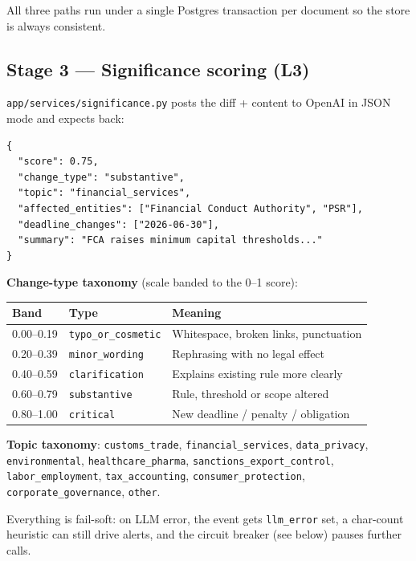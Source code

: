 \documentclass[11pt,a4paper]{article}
\begin{document}
All three paths run under a single Postgres transaction per document
so the store is always consistent.

\subsection{Stage 3 --- Significance scoring (L3)}

\texttt{app/services/significance.py} posts the diff + content to
OpenAI in JSON mode and expects back:

\begin{lstlisting}[style=output]
{
  "score": 0.75,
  "change_type": "substantive",
  "topic": "financial_services",
  "affected_entities": ["Financial Conduct Authority", "PSR"],
  "deadline_changes": ["2026-06-30"],
  "summary": "FCA raises minimum capital thresholds..."
}
\end{lstlisting}

\textbf{Change-type taxonomy} (scale banded to the 0--1 score):

\begin{center}
\small
\begin{tabular}{lll}
\toprule
\textbf{Band}       & \textbf{Type}            & \textbf{Meaning} \\
\midrule
0.00--0.19 & \texttt{typo\_or\_cosmetic} & Whitespace, broken links, punctuation \\
0.20--0.39 & \texttt{minor\_wording}     & Rephrasing with no legal effect \\
0.40--0.59 & \texttt{clarification}      & Explains existing rule more clearly \\
0.60--0.79 & \texttt{substantive}        & Rule, threshold or scope altered \\
0.80--1.00 & \texttt{critical}           & New deadline / penalty / obligation \\
\bottomrule
\end{tabular}
\end{center}

\textbf{Topic taxonomy}: \texttt{customs\_trade},
\texttt{financial\_services}, \texttt{data\_privacy},
\texttt{environmental}, \texttt{healthcare\_pharma},
\texttt{sanctions\_export\_control}, \texttt{labor\_employment},
\texttt{tax\_accounting}, \texttt{consumer\_protection},
\texttt{corporate\_governance}, \texttt{other}.

Everything is fail-soft: on LLM error, the event gets
\texttt{llm\_error} set, a char-count heuristic can still drive
alerts, and the circuit breaker (see below) pauses further calls.
\end{document}
